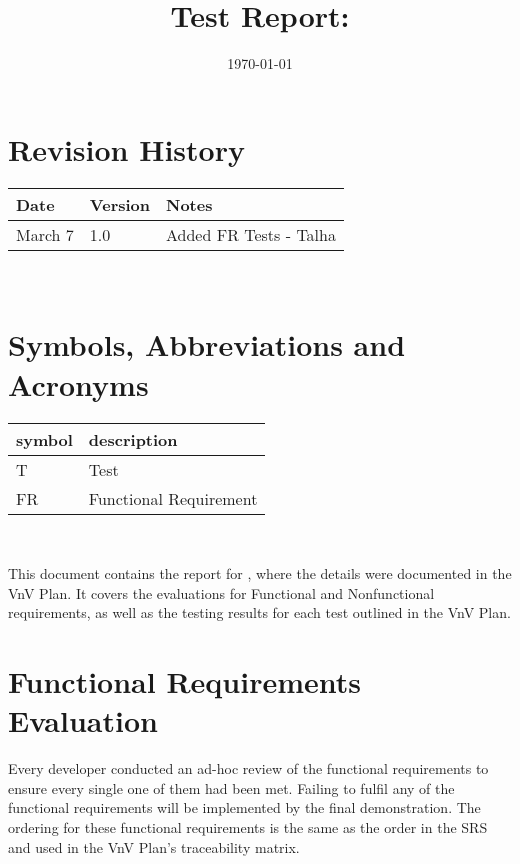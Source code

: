 \documentclass[12pt, titlepage]{article}
\begin{document}
\title{Test Report: \progname} 
\author{\authname}
\date{\today}
	
\maketitle


\section{Revision History}

\begin{tabularx}{\textwidth}{p{3cm}p{2cm}X}
\toprule {\bf Date} & {\bf Version} & {\bf Notes}\\
\midrule
March 7 & 1.0 & Added FR Tests - Talha\\
\bottomrule
\end{tabularx}

~\newpage

\section{Symbols, Abbreviations and Acronyms}

\renewcommand{\arraystretch}{1.2}
\begin{tabular}{l l} 
  \toprule		
  \textbf{symbol} & \textbf{description}\\
  \midrule 
  T & Test\\
  FR & Functional Requirement\\
  \bottomrule
\end{tabular}\\

\newpage

\tableofcontents

\listoftables %

\listoffigures %

\newpage


This document contains the report for \progname , where the details were documented in the VnV Plan. It covers the evaluations for Functional and Nonfunctional requirements, as well as the testing results for each test outlined in the VnV Plan.

\section{Functional Requirements Evaluation}
Every developer conducted an ad-hoc review of the functional requirements to ensure every single one of them had been met. Failing to fulfil any of the functional requirements will be implemented by the final demonstration. The ordering for these functional requirements is the same as the order in the SRS and used in the VnV Plan's traceability matrix.
\end{document}
